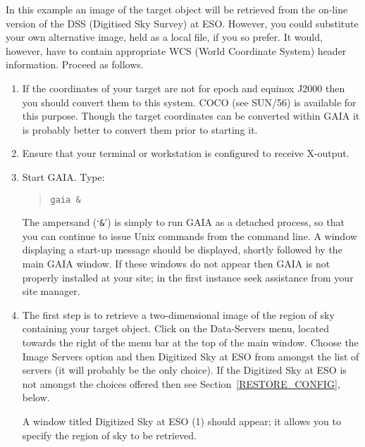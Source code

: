 \documentclass[twoside,11pt]{article}
\renewcommand{\_}{\texttt{\symbol{95}}}
\begin{document}
In this example an image of the target object will be retrieved from
the on-line version of the DSS (Digitised Sky Survey) at ESO.  However,
you could substitute your own alternative image, held as a local file,
if you so prefer.  It would, however, have to contain appropriate WCS
(World Coordinate System) header information.  Proceed as follows.

\begin{enumerate}

  \item If the coordinates of your target are not for epoch and equinox
   J2000 then you should convert them to this system.  COCO (see
   SUN/56\cite{SUN56}) is available for this purpose.  Though the target
   coordinates can be converted within GAIA it is probably better to
   convert them prior to starting it.

  \item Ensure that your terminal or workstation is configured to
   receive X-output.

  \item Start GAIA.  Type:

  \begin{quote}
   {\tt gaia \&}
  \end{quote}

   The ampersand (`{\tt \&}') is simply to run GAIA as a detached process,
   so that you can continue to issue Unix commands from the command line.
   A window displaying a start-up message should be displayed, shortly
   followed by the main GAIA window.  If these windows do not appear then
   GAIA is not properly installed at your site; in the first instance
   seek assistance from your site manager.

  \item The first step is to retrieve a two-dimensional image of the
   region of sky containing your target object.  Click on the {\sf
   Data-Servers} menu, located towards the right of the menu bar at the
   top of the main window.  Choose the {\sf Image Servers} option and
   then {\sf Digitized Sky at ESO} from amongst the list of servers (it
   will probably be the only choice).  If the {\sf Digitized Sky at ESO}
   is not amongst the choices offered then see
   Section~\ref{RESTORE_CONFIG}, below.

   A window titled {\sf Digitized Sky at ESO (1)} should appear; it allows
   you to specify the region of sky to be retrieved.

  \begin{itemize}


\end{itemize}
\end{enumerate}
\end{document}
